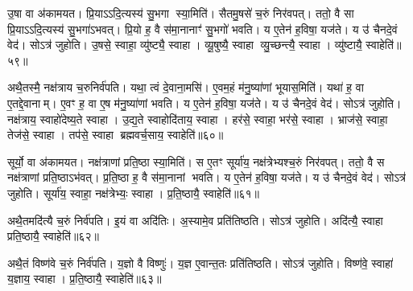 उ॒षा वा अ॑कामयत।
प्रि॒या\-ऽऽदि॒त्यस्य॑ सु॒भगा स्या॒मिति॑।
सैतमु॒षसे॑ च॒रुं निर॑वपत्।
ततो॒ वै सा प्रि॒या\-ऽऽदि॒त्यस्य॑ सु॒भगा॑\-ऽभवत्।
प्रि॒यो ह॒ वै स॑मा॒नानाꣳ॑ सु॒भगो॑ भवति।
य ए॒तेन॑ ह॒विषा॒ यज॑ते।
य उ॑ चैनदे॒वं वेद॑।
सोऽत्र॑ जुहोति।
उ॒षसे॒ स्वाहा॒ व्यु॑ष्ट्यै॒ स्वाहा।
व्यू॒षुष्यै॒ स्वाहा व्यु॒च्छन्त्यै॒ स्वाहा।
व्यु॑ष्टायै॒ स्वाहेति॑॥५९॥

अथै॒तस्मै॒ नक्ष॑त्राय च॒रुनिर्व॑पति।
यथा॒ त्वं दे॒वाना॒मसि॑।
ए॒वम॒हं म॑नु॒ष्या॑णां भूयास॒मिति॑।
यथा॑ ह॒ वा ए॒तद्दे॒वानाम्।
ए॒वꣳ ह॒ वा ए॒ष म॑नु॒ष्या॑णां भवति।
य ए॒तेन॑ ह॒विषा॒ यज॑ते।
य उ॑ चैनदे॒वं वेद॑।
सोऽत्र॑ जुहोति।
नक्ष॑त्राय॒ स्वाहो॑देष्य॒ते स्वाहा।
उ॒द्य॒ते स्वाहोदि॑ताय॒ स्वाहा।
हर॑से॒ स्वाहा॒ भर॑से॒ स्वाहा।
भ्राज॑से॒ स्वाहा॒ तेज॑से॒ स्वाहा।
तप॑से॒ स्वाहा ब्रह्मवर्च॒साय॒ स्वाहेति॑॥६०॥

सूर्यो॒ वा अ॑कामयत।
नक्ष॑त्राणां प्रति॒ष्ठा स्या॒मिति॑।
स ए॒तꣳ सूर्या॑य॒ नक्ष॑त्रेभ्यश्च॒रुं निर॑वपत्।
ततो॒ वै स नक्ष॑त्राणां प्रति॒ष्ठा\-ऽभ॑वत्।
प्र॒ति॒ष्ठा ह॒ वै स॑मा॒नानां भवति।
य ए॒तेन॑ ह॒विषा॒ यज॑ते।
य उ॑ चैनदे॒वं वेद॑।
सोऽत्र॑ जुहोति।
सूर्या॑य॒ स्वाहा॒ नक्ष॑त्रेभ्यः॒ स्वाहा।
प्र॒ति॒ष्ठायै॒ स्वाहेति॑॥६१॥

अथै॒तमदि॑त्यै च॒रुं निर्व॑पति।
इ॒यं वा अदि॑तिः।
अ॒स्यामे॒व प्रति॑तिष्ठति।
सोऽत्र॑ जुहोति।
अदि॑त्यै॒ स्वाहा प्रति॒ष्ठायै॒ स्वाहेति॑॥६२॥

अथै॒तं विष्ण॑वे च॒रुं निर्व॑पति।
य॒ज्ञो वै विष्णुः॑।
य॒ज्ञ ए॒वान्त॒तः प्रति॑तिष्ठति।
सोऽत्र॑ जुहोति।
विष्ण॑वे॒ स्वाहा॑ य॒ज्ञाय॒ स्वाहा।
प्र॒ति॒ष्ठायै॒ स्वाहेति॑॥६३॥




